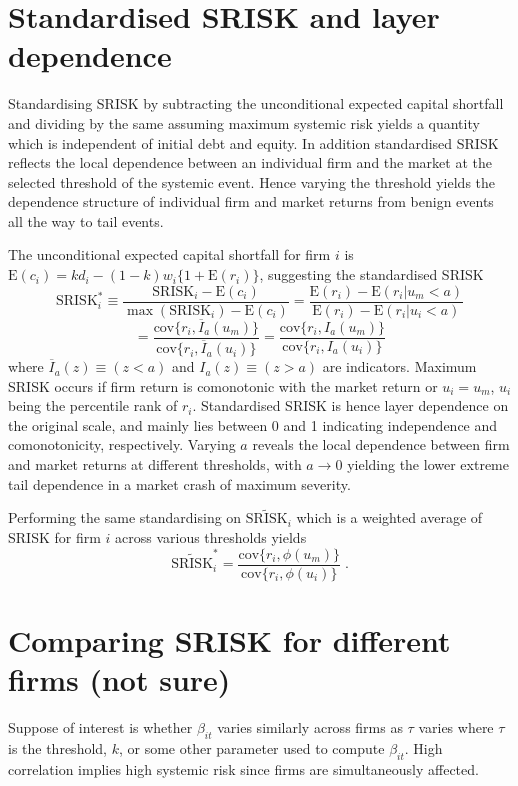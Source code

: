 \documentclass[authoryear]{elsarticle}
\newcommand{\E}{\mathrm{E}}
\newcommand{\cov}{\mathrm{cov}}
\begin{document}
\section{Standardised SRISK and layer dependence}

Standardising SRISK by subtracting the unconditional expected capital shortfall and dividing by the same assuming maximum systemic risk yields a quantity which is independent of initial debt and equity. In addition standardised SRISK reflects the local dependence between an individual firm and the market at the selected threshold of the systemic event. Hence varying the threshold yields the dependence structure of individual firm and market returns from benign events all the way to tail events.

The unconditional expected capital shortfall for firm $i$ is $\E(c_i)=kd_i-(1-k)w_i\{1+\E(r_i)\}$, suggesting the standardised SRISK
$$
\mathrm{SRISK}_i^* \equiv \frac{\mathrm{SRISK}_i-\E(c_i)}{\max(\mathrm{SRISK}_i)-\E(c_i)}
=\frac{\E(r_i)-\E(r_i|u_m<a)}{\E(r_i)-\E(r_i|u_i<a)}
$$
$$
=\frac{\cov\{r_i,\overline{I}_a(u_m)\}}{\cov\{r_i,\overline{I}_a(u_i)\}}
=\frac{\cov\{r_i,I_a(u_m)\}}{\cov\{r_i,I_a(u_i)\}} 
$$
where $\overline{I}_a(z)\equiv (z<a)$ and $I_a(z)\equiv (z>a)$ are indicators. Maximum SRISK occurs if firm return is comonotonic with the market return or $u_i=u_m$, $u_i$ being the percentile rank of $r_i$. Standardised SRISK is hence layer dependence on the original scale, and mainly lies between 0 and 1 indicating independence and comonotonicity, respectively. Varying $a$ reveals the local dependence between firm and market returns at different thresholds, with $a\rightarrow 0$ yielding the lower extreme tail dependence in a market crash of maximum severity.

Performing the same standardising on $\widetilde{\mathrm{SRISK}}_i$ which is a weighted average of SRISK for firm $i$ across various thresholds yields
$$
\widetilde{\mathrm{SRISK}}_i^* = \frac{\cov\{r_i,\phi(u_m)\}}{\cov\{r_i,\phi(u_i)\}}   \;.
$$





\section{Comparing SRISK for different firms (not sure)}

Suppose of interest is whether $\beta_{it}$ varies similarly  across firms as $\tau$ varies where $\tau$ is the threshold, $k$, or some other parameter used to compute $\beta_{it}$. High correlation implies high systemic risk since firms are simultaneously affected.
\end{document}
